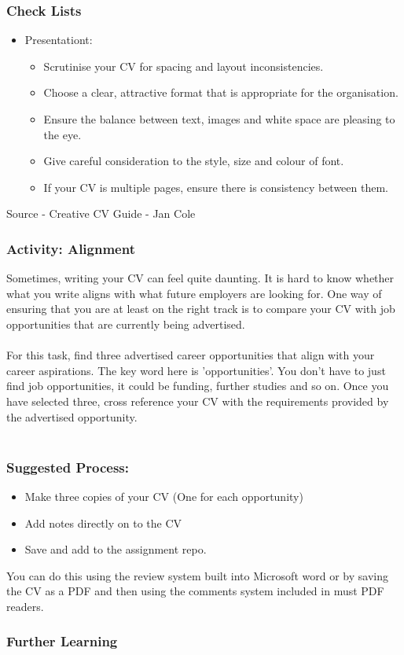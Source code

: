 \begin{frame}
	\frametitle{Check Lists}
	\begin{itemize}
		\item Presentationt:
  		\begin{itemize}
			\item Scrutinise your CV for spacing and layout inconsistencies.
			\item Choose a clear, attractive format that is appropriate for the organisation.
			\item Ensure the balance between text, images and white space are pleasing to the eye.
			\item Give careful consideration to the style, size and colour of font.
			\item If your CV is multiple pages, ensure there is consistency between them.
    		 \end{itemize}
	\end{itemize}
	Source - Creative CV Guide - Jan Cole
\end{frame}

\begin{frame}
	\frametitle{Activity: Alignment}
	\small{
Sometimes, writing your CV can feel quite daunting. It is hard to know whether what you write aligns with what future employers are looking for. One way of ensuring that you are at least on the right track is to compare your CV with job opportunities that are currently being advertised. \\~\\
For this task, find three advertised career opportunities that align with your career aspirations. The key word here is 'opportunities'. You don't have to just find job opportunities, it could be funding, further studies and so on. Once you have selected three, cross reference your CV with the requirements provided by the advertised opportunity.  \\~\\
 } 
\end{frame}
	
\begin{frame}
	\frametitle{Suggested Process: }
	\begin{itemize}
		\item Make three copies of your CV (One for each opportunity)
		\item Add notes directly on to the CV 
		\item Save and add to the assignment repo.
	\end{itemize}

You can do this using the review system built into Microsoft word or by saving the CV as a PDF and then using the comments system included in must PDF readers.	

\end{frame}


\begin{frame}
	\frametitle{Further Learning}
\end{frame}



